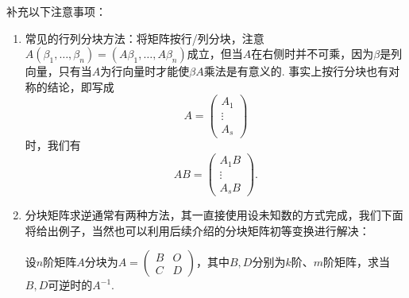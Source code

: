 补充以下注意事项：
\begin{enumerate}
    \item 常见的行列分块方法：将矩阵按行/列分块，注意$A(\beta_1,\ldots,\beta_n)=(A\beta_1,\ldots,A\beta_n)$成立，但当$A$在右侧时并不可乘，因为$\beta$是列向量，只有当$A$为行向量时才能使$\beta A$乘法是有意义的. 事实上按行分块也有对称的结论，即写成
          \[A=\begin{pmatrix}
                  A_1 \\ \vdots \\ A_s
              \end{pmatrix}\]
          时，我们有
          \[AB=\begin{pmatrix}
                  A_1B \\ \vdots \\ A_sB
              \end{pmatrix}.\]

    \item 分块矩阵求逆通常有两种方法，其一直接使用设未知数的方式完成，我们下面将给出例子，当然也可以利用后续介绍的分块矩阵初等变换进行解决：
          \begin{example}{}{}
              设$n$阶矩阵$A$分块为$A=\begin{pmatrix}
                      B & O \\ C & D
                  \end{pmatrix}$，其中$B,D$分别为$k$阶、$m$阶矩阵，求当$B,D$可逆时的$A^{-1}$.
          \end{example}


\end{enumerate}
